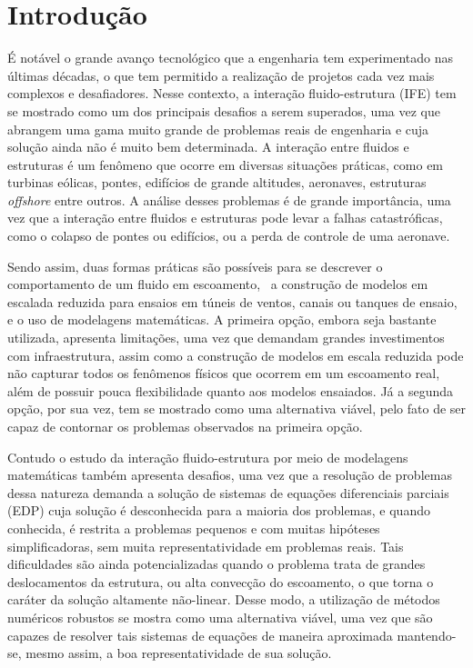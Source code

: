 \chapter{Introdução}


É notável o grande avanço tecnológico que a engenharia tem experimentado nas últimas décadas, o que tem permitido a realização de projetos cada vez mais complexos e desafiadores. Nesse contexto, a interação fluido-estrutura (IFE) tem se mostrado como um dos principais desafios a serem superados, uma vez que abrangem uma gama muito grande de problemas reais de engenharia e cuja solução ainda não é muito bem determinada. A interação entre fluidos e estruturas é um fenômeno que ocorre em diversas situações práticas, como em turbinas eólicas, pontes, edifícios de grande altitudes, aeronaves, estruturas \textit{offshore} entre outros. A análise desses problemas é de grande importância, uma vez que a interação entre fluidos e estruturas pode levar a falhas catastróficas, como o colapso de pontes ou edifícios, ou a perda de controle de uma aeronave.

Sendo assim, duas formas práticas são possíveis para se descrever o comportamento de um fluido em escoamento, \ie\ a construção de modelos em escalada reduzida para ensaios em túneis de ventos, canais ou tanques de ensaio, e o uso de modelagens matemáticas. A primeira opção, embora seja bastante utilizada, apresenta limitações, uma vez que demandam grandes investimentos com infraestrutura, assim como a construção de modelos em escala reduzida pode não capturar todos os fenômenos físicos que ocorrem em um escoamento real, além de possuir pouca flexibilidade quanto aos modelos ensaiados. Já a segunda opção, por sua vez, tem se mostrado como uma alternativa viável, pelo fato de ser capaz de contornar os problemas observados na primeira opção.

Contudo o estudo da interação fluido-estrutura por meio de modelagens matemáticas também apresenta desafios, uma vez que a resolução de problemas dessa natureza demanda a solução de sistemas de equações diferenciais parciais (EDP) cuja solução é desconhecida para a maioria dos problemas, e quando conhecida, é restrita a problemas pequenos e com muitas hipóteses simplificadoras, sem muita representatividade em problemas reais. Tais dificuldades são ainda potencializadas quando o problema trata de grandes deslocamentos da estrutura, ou alta convecção do escoamento, o que torna o caráter da solução altamente não-linear. Desse modo, a utilização de métodos numéricos robustos se mostra como uma alternativa viável, uma vez que são capazes de resolver tais sistemas de equações de maneira aproximada mantendo-se, mesmo assim, a boa representatividade de sua solução.

